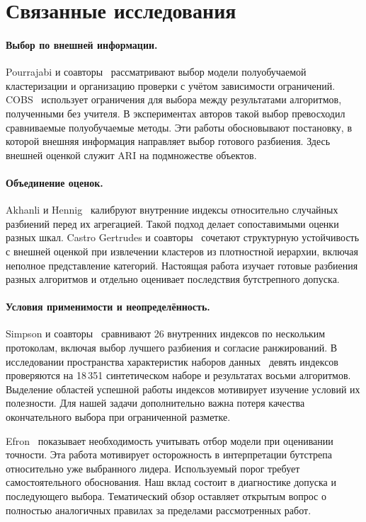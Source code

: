 \section{Связанные исследования}\label{sec:related}
\paragraph{Выбор по внешней информации.}
Pourrajabi и соавторы~\citep{pourrajabi2014} рассматривают выбор модели полуобучаемой кластеризации и организацию проверки с учётом зависимости ограничений. COBS~\citep{cobs2017} использует ограничения для выбора между результатами алгоритмов, полученными без учителя. В экспериментах авторов такой выбор превосходил сравниваемые полуобучаемые методы. Эти работы обосновывают постановку, в которой внешняя информация направляет выбор готового разбиения. Здесь внешней оценкой служит ARI на подмножестве объектов.

\paragraph{Объединение оценок.}
Akhanli и Hennig~\citep{akhanli2020} калибруют внутренние индексы относительно случайных разбиений перед их агрегацией. Такой подход делает сопоставимыми оценки разных шкал. Castro Gertrudes и соавторы~\citep{gertrudes2019} сочетают структурную устойчивость с внешней оценкой при извлечении кластеров из плотностной иерархии, включая неполное представление категорий. Настоящая работа изучает готовые разбиения разных алгоритмов и отдельно оценивает последствия бутстрепного допуска.

\paragraph{Условия применимости и неопределённость.}
Simpson и соавторы~\citep{simpson2026benchmark} сравнивают 26 внутренних индексов по нескольким протоколам, включая выбор лучшего разбиения и согласие ранжирований. В исследовании пространства характеристик наборов данных~\citep{simpson2026instance} девять индексов проверяются на 18\,351 синтетическом наборе и результатах восьми алгоритмов. Выделение областей успешной работы индексов мотивирует изучение условий их полезности. Для нашей задачи дополнительно важна потеря качества окончательного выбора при ограниченной разметке.

Efron~\citep{efron2014} показывает необходимость учитывать отбор модели при оценивании точности. Эта работа мотивирует осторожность в интерпретации бутстрепа относительно уже выбранного лидера. Используемый порог требует самостоятельного обоснования. Наш вклад состоит в диагностике допуска и последующего выбора. Тематический обзор оставляет открытым вопрос о полностью аналогичных правилах за пределами рассмотренных работ.
